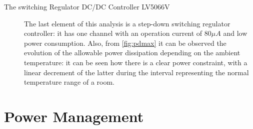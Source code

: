 \documentclass[11pt,a4paper,titlepage]{article}
\begin{document}
\begin{description}
				  \item[The switching Regulator DC/DC Controller LV5066V] The last element of this analysis is a step-down switching regulator controller: it has one channel with an operation current of 80$\mu A$ and low power consumption. Also, from \autoref{fig:pdmax} it can be observed the evolution of the allowable power dissipation depending on the ambient temperature: it can be seen how there is a clear power constraint, with a linear decrement of the latter during the interval representing the normal temperature range of a room.

				\end{description}

\section{Power Management} \label{sec:power_management}
\end{document}
